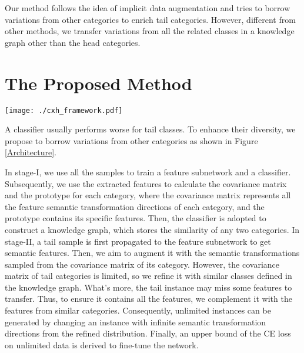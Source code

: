 \documentclass[letterpaper]{article} \usepackage{aaai22}  \usepackage{times}  \usepackage{helvet}  \usepackage{courier}  \usepackage[hyphens]{url}  \usepackage{graphicx} \usepackage{bm}
\begin{document}
	Our method follows the idea of implicit data augmentation and tries to borrow variations from other categories to enrich tail categories. However, different from other methods, we transfer variations from all the related classes in a knowledge graph other than the head categories. 
	


	\section{The Proposed Method}
	\begin{figure*}[!tp]
\centering
		\texttt{[image: ./cxh\_framework.pdf]}
\caption{The framework of RISDA. In Stage-I, all training data is used to train a feature subnet and a classifier. Subsequently, we calculate the covariance matrix and the prototype for each category with the feature extracted with the subnet. Then, the classifier is used to construct a knowledge graph. In Stage-II, we augment each tail instance with a semantic transformation direction sampled from the covariance matrix. For tail classes, the covariance matrix is limited, so we refine it with similar classes defined in the knowledge graph. What's more, to ensure the tail instance contains all the features to transfer, we complement it with the prototypes from similar categories. Finally, unlimited instances can be sampled to calculate the  
		}
		\label{Architecture}
	\end{figure*}
	A classifier usually performs worse for tail classes. To enhance their diversity, we propose to borrow variations from other categories as shown in Figure \ref{Architecture}.
	
	In stage-I, we use all the samples to train a feature subnetwork and a classifier. Subsequently, we use the extracted features to calculate the covariance matrix and the prototype for each category, where the covariance matrix represents all the feature semantic transformation directions of each category, and the prototype contains its specific features. Then, the classifier is adopted to construct a knowledge graph, which stores the similarity of any two categories. In stage-II, a tail sample is first propagated to the feature subnetwork to get semantic features. Then, we aim to augment it with the semantic transformations sampled from the covariance matrix of its category. However, the covariance matrix of tail categories is limited, so we refine it with similar classes defined in the knowledge graph. What's more, the tail instance may miss some features to transfer. Thus, to ensure it contains all the features, we complement it with the features from similar categories. Consequently, unlimited instances can be generated by changing an instance with infinite semantic transformation directions from the refined distribution. Finally, an upper bound of the CE loss on unlimited data is derived to fine-tune the network.
	
\end{document}
